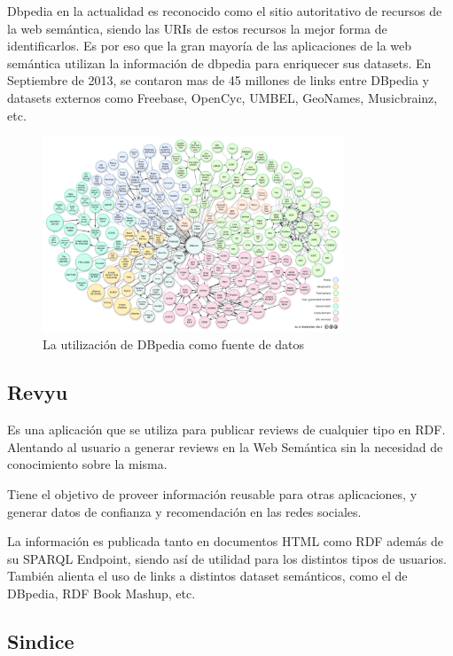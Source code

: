 Dbpedia en la actualidad es reconocido como el sitio autoritativo de recursos de la web semántica, siendo las URIs de estos recursos 
la mejor forma de identificarlos.
Es por eso que la gran mayoría de las aplicaciones de la web semántica utilizan la información de dbpedia para enriquecer sus datasets.
En Septiembre de 2013, se contaron mas de 45 millones de links entre DBpedia y datasets externos como  Freebase, OpenCyc, UMBEL, GeoNames,
Musicbrainz, etc.

\begin{figure}
    \centering
    \includegraphics[width=0.8\textwidth,natwidth=610,natheight=642]{dbpedia}
    \caption{La utilización de DBpedia como fuente de datos}
\end{figure}

\subsection{Revyu}

Es una aplicación que se utiliza para publicar reviews de cualquier tipo en RDF. Alentando al usuario a generar reviews en la Web Semántica 
sin la necesidad de conocimiento sobre la misma.

Tiene el objetivo de proveer información reusable para otras aplicaciones, y generar datos de confianza y recomendación en las redes sociales.

La información es publicada tanto en documentos HTML como RDF además de su SPARQL Endpoint, siendo así de utilidad para los distintos tipos de usuarios.
También alienta el uso de links a distintos dataset semánticos, como el de DBpedia, RDF Book Mashup, etc.

\subsection{Sindice} 

